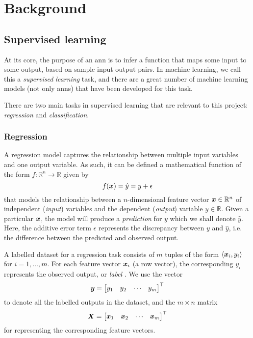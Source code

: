 \documentclass[../main.tex]{subfiles}
\begin{document}
\chapter{Background}

\section{Supervised learning}
At its core, the purpose of an \gls{ann} is to infer a function that maps some input to some output, based on sample input-output pairs.
In machine learning, we call this a \emph{supervised learning} task, and there are a great number of machine learning models (not only \glspl{ann}) that have been developed for this task.

There are two main tasks in supervised learning that are relevant to this project: \emph{regression} and \emph{classification}.

\subsection{Regression}
A regression model captures the relationship between multiple input variables and one output variable. 
As such, it can be defined a mathematical function of the form $f:\mathbb{R}^n\rightarrow \mathbb{R}$ given by
\begin{equation}
    \label{eq:reg_model}
    f({\bm{x}}) = \hat{y} = y + \epsilon
\end{equation}
that models the relationship between a $n$-dimensional feature vector ${\bm{x}} \in \mathbb{R}^n$ of independent (\emph{input}) variables and the dependent (\emph{output}) variable $y \in \mathbb{R}$. 
Given a particular ${\bm{x}}$, the model will produce a \emph{prediction} for $y$ which we shall denote $\hat{y}$.
Here, the additive error term $\epsilon$ represents the discrepancy between $y$ and $\hat{y}$, i.e. the difference between the predicted and observed output.

A labelled dataset for a regression task consists of $m$ tuples of the form
$\langle {\bm{x}}_i, y_i\rangle$
for $i=1,\dots,m$.
For each feature vector ${\bm{x}}_i$ (a row vector), the corresponding $y_i$ represents the observed output, or \emph{label} \cite{burkov2019}.
We use the vector
\begin{equation}
    \label{eq:sup_learn_target}
    {\bm{y}} = \begin{bmatrix}
        y_1 & y_2 & \cdots & y_m
    \end{bmatrix}^\top
\end{equation}
to denote all the labelled outputs in the dataset, and the $m \times n$ matrix
\begin{equation}
    \label{eq:sup_learn_input_matrix}
    {\bm{X}} = \begin{bmatrix}
        {\bm{x}}_1 & {\bm{x}}_2 & \cdots & {\bm{x}}_m
    \end{bmatrix}^\top
\end{equation}
for representing the corresponding feature vectors.
\end{document}
